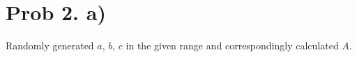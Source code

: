 \section{Prob 2. a)}




Randomly generated $a$, $b$, $c$ in the given range and correspondingly calculated $A$.

